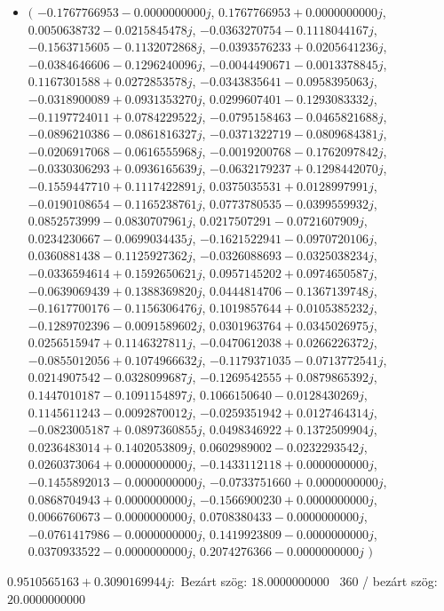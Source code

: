 \documentclass[14pt,a4paper]{article}
\begin{document}
\begin{itemize}
\item
$\big($
$-0.1767766953-0.0000000000j$, $0.1767766953+0.0000000000j$, $0.0050638732-0.0215845478j$, $-0.0363270754-0.1118044167j$, $-0.1563715605-0.1132072868j$, $-0.0393576233+0.0205641236j$, $-0.0384646606-0.1296240096j$, $-0.0044490671-0.0013378845j$, $0.1167301588+0.0272853578j$, $-0.0343835641-0.0958395063j$, $-0.0318900089+0.0931353270j$, $0.0299607401-0.1293083332j$, $-0.1197724011+0.0784229522j$, $-0.0795158463-0.0465821688j$, $-0.0896210386-0.0861816327j$, $-0.0371322719-0.0809684381j$, $-0.0206917068-0.0616555968j$, $-0.0019200768-0.1762097842j$, $-0.0330306293+0.0936165639j$, $-0.0632179237+0.1298442070j$, $-0.1559447710+0.1117422891j$, $0.0375035531+0.0128997991j$, $-0.0190108654-0.1165238761j$, $0.0773780535-0.0399559932j$, $0.0852573999-0.0830707961j$, $0.0217507291-0.0721607909j$, $0.0234230667-0.0699034435j$, $-0.1621522941-0.0970720106j$, $0.0360881438-0.1125927362j$, $-0.0326088693-0.0325038234j$, $-0.0336594614+0.1592650621j$, $0.0957145202+0.0974650587j$, $-0.0639069439+0.1388369820j$, $0.0444814706-0.1367139748j$, $-0.1617700176-0.1156306476j$, $0.1019857644+0.0105385232j$, $-0.1289702396-0.0091589602j$, $0.0301963764+0.0345026975j$, $0.0256515947+0.1146327811j$, $-0.0470612038+0.0266226372j$, $-0.0855012056+0.1074966632j$, $-0.1179371035-0.0713772541j$, $0.0214907542-0.0328099687j$, $-0.1269542555+0.0879865392j$, $0.1447010187-0.1091154897j$, $0.1066150640-0.0128430269j$, $0.1145611243-0.0092870012j$, $-0.0259351942+0.0127464314j$, $-0.0823005187+0.0897360855j$, $0.0498346922+0.1372509904j$, $0.0236483014+0.1402053809j$, $0.0602989002-0.0232293542j$, $0.0260373064+0.0000000000j$, $-0.1433112118+0.0000000000j$, $-0.1455892013-0.0000000000j$, $-0.0733751660+0.0000000000j$, $0.0868704943+0.0000000000j$, $-0.1566900230+0.0000000000j$, $0.0066760673-0.0000000000j$, $0.0708380433-0.0000000000j$, $-0.0761417986-0.0000000000j$, $0.1419923809-0.0000000000j$, $0.0370933522-0.0000000000j$, $0.2074276366-0.0000000000j$
$\big)$
\end{itemize}
$0.9510565163+0.3090169944j$:\
Bezárt szög: $18.0000000000$ \
360 / bezárt szög: $20.0000000000$\
\end{document}
